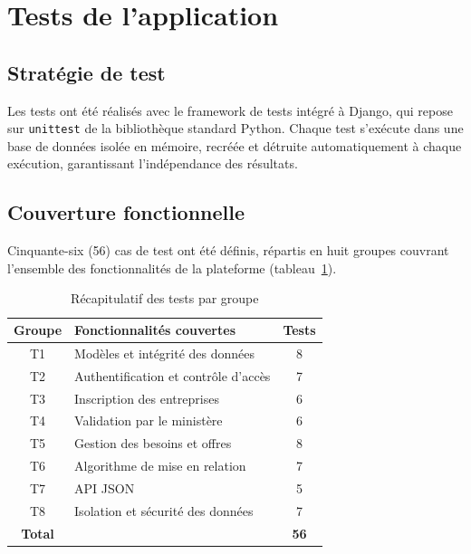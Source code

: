\documentclass[12pt, a4paper, oneside]{report}
\begin{document}
\section{Tests de l'application}

\subsection{Stratégie de test}
Les tests ont été réalisés avec le framework de tests intégré à Django,
qui repose sur \texttt{unittest} de la bibliothèque standard Python.
Chaque test s'exécute dans une base de données isolée en mémoire,
recréée et détruite automatiquement à chaque exécution, garantissant
l'indépendance des résultats.

\subsection{Couverture fonctionnelle}
Cinquante-six (56) cas de test ont été définis, répartis en huit groupes
couvrant l'ensemble des fonctionnalités de la plateforme
(tableau~\ref{tab:tests}).

\begin{table}[htbp]
	\centering
	\caption{Récapitulatif des tests par groupe}
	\label{tab:tests}
	\begin{tabular}{clc}
		\hline
		\textbf{Groupe} & \textbf{Fonctionnalités couvertes} & \textbf{Tests} \\
		\hline
		T1 & Modèles et intégrité des données     & 8  \\
		T2 & Authentification et contrôle d'accès & 7  \\
		T3 & Inscription des entreprises           & 6  \\
		T4 & Validation par le ministère           & 6  \\
		T5 & Gestion des besoins et offres         & 8  \\
		T6 & Algorithme de mise en relation        & 7  \\
		T7 & API JSON                              & 5  \\
		T8 & Isolation et sécurité des données     & 7  \\
		\hline
		\textbf{Total} & & \textbf{56} \\
		\hline
	\end{tabular}
\end{table}
\end{document}
